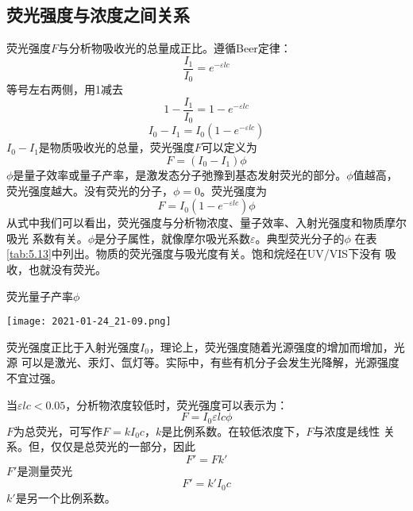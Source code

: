 \subsection{荧光强度与浓度之间关系}
荧光强度$F$与分析物吸收光的总量成正比。遵循Beer定律：
\begin{equation}
    \frac{I_1}{I_0} = e^{-\varepsilon lc}
    \label{5.4}
\end{equation}
等号左右两侧，用1减去
\begin{equation}
    1-\frac{I_1}{I_0} = 1 - e^{-\varepsilon lc}
    \label{5.5}
\end{equation}
\begin{equation}
    I_0 - I_1 = I_0 (1-e^{-\varepsilon lc})
    \label{5.6}
\end{equation}
$I_0 - I_1$是物质吸收光的总量，荧光强度$F$可以定义为
\begin{equation}
    F=(I_0-I_1)\phi
    \label{5.7}
\end{equation}
$\phi$是量子效率或量子产率，是激发态分子弛豫到基态发射荧光的部分。$\phi$值越高，
荧光强度越大。没有荧光的分子，$\phi=0$。荧光强度为
\begin{equation}
    F = I_0(1-e^{-\varepsilon lc})\phi
    \label{5.8}
\end{equation}
从式中我们可以看出，荧光强度与分析物浓度、量子效率、入射光强度和物质摩尔吸光
系数有关。$\phi$是分子属性，就像摩尔吸光系数$\varepsilon$。典型荧光分子的$\phi$
在表\ref{tab:5.13}中列出。物质的荧光强度与吸光度有关。饱和烷烃在UV/VIS下没有
吸收，也就没有荧光。
\begin{table}[htbp]
    \centering
    \caption{荧光量子产率$\phi$}
    \label{tab:5.13}
    \texttt{[image: 2021-01-24\_21-09.png]}
\end{table}

荧光强度正比于入射光强度$I_0$，理论上，荧光强度随着光源强度的增加而增加，光源
可以是激光、汞灯、氙灯等。实际中，有些有机分子会发生光降解，光源强度不宜过强。

当$\varepsilon lc < 0.05$，分析物浓度较低时，荧光强度可以表示为：
\begin{equation}
    F = I_0 \varepsilon lc\phi
    \label{5.9}
\end{equation}
$F$为总荧光，可写作$F=kI_0 c$，$k$是比例系数。在较低浓度下，$F$与浓度是线性
关系。但，仅仅是总荧光的一部分，因此
\begin{equation}
    F'=Fk'
    \label{5.10}
\end{equation}
$F'$是测量荧光
\begin{equation}
    F' = k' I_0 c
    \label{5.11}
\end{equation}
$k'$是另一个比例系数。

